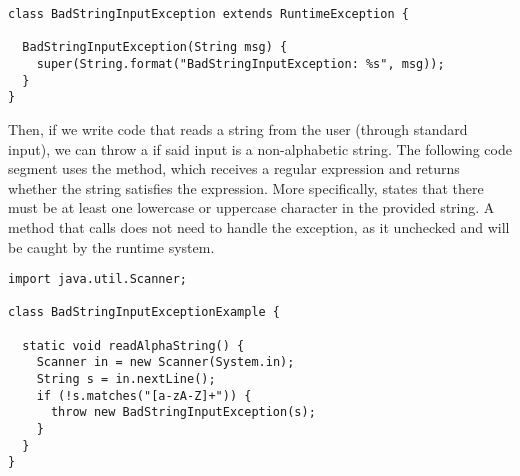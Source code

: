 \begin{lstlisting}[language=MyJava]
class BadStringInputException extends RuntimeException {
  
  BadStringInputException(String msg) {
    super(String.format("BadStringInputException: %s", msg));
  }
}
\end{lstlisting}

Then, if we write code that reads a string from the user (through standard input), we can throw a  if said input is a non-alphabetic string. 
The following code segment uses the  method, which receives a regular expression and returns whether the string satisfies the expression. 
More specifically, \ttt{[a-zA-Z]+} states that there must be at least one lowercase or uppercase character in the provided string.
A method that calls  does not need to handle the exception, as it unchecked and will be caught by the runtime system.

\begin{lstlisting}[language=MyJava]
import java.util.Scanner;

class BadStringInputExceptionExample {
  
  static void readAlphaString() {
    Scanner in = new Scanner(System.in);
    String s = in.nextLine();
    if (!s.matches("[a-zA-Z]+")) { 
      throw new BadStringInputException(s); 
    }
  }
}
\end{lstlisting}
